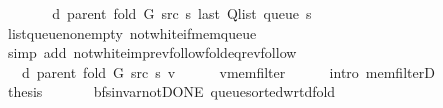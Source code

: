 \begin{isabellebody}
\ \ \isamarkupfalse%
\ \isamarkupfalse%
\ {\isachardoublequoteopen}{\isachardot}{\kern0pt}{\isachardot}{\kern0pt}{\isachardot}{\kern0pt}\ {\isacharequal}{\kern0pt}\ d\ {\isacharparenleft}{\kern0pt}parent\ {\isacharparenleft}{\kern0pt}fold\ G\ src\ s{\isacharparenright}{\kern0pt}{\isacharparenright}{\kern0pt}\ {\isacharparenleft}{\kern0pt}last\ {\isacharparenleft}{\kern0pt}Q{\isacharunderscore}{\kern0pt}list\ {\isacharparenleft}{\kern0pt}queue\ s{\isacharparenright}{\kern0pt}{\isacharparenright}{\kern0pt}{\isacharparenright}{\kern0pt}{\isachardoublequoteclose}\isanewline
\ \ \ \ \isamarkupfalse%
\ list{\isacharunderscore}{\kern0pt}queue{\isacharunderscore}{\kern0pt}non{\isacharunderscore}{\kern0pt}empty\ not{\isacharunderscore}{\kern0pt}white{\isacharunderscore}{\kern0pt}if{\isacharunderscore}{\kern0pt}mem{\isacharunderscore}{\kern0pt}queue\isanewline
\ \ \ \ \isamarkupfalse%
\ {\isacharparenleft}{\kern0pt}simp\ add{\isacharcolon}{\kern0pt}\ not{\isacharunderscore}{\kern0pt}white{\isacharunderscore}{\kern0pt}imp{\isacharunderscore}{\kern0pt}rev{\isacharunderscore}{\kern0pt}follow{\isacharunderscore}{\kern0pt}fold{\isacharunderscore}{\kern0pt}eq{\isacharunderscore}{\kern0pt}rev{\isacharunderscore}{\kern0pt}follow{\isacharparenright}{\kern0pt}\isanewline
\ \ \isamarkupfalse%
\ \isamarkupfalse%
\ {\isachardoublequoteopen}{\isachardot}{\kern0pt}{\isachardot}{\kern0pt}{\isachardot}{\kern0pt}\ {\isasymle}\ d\ {\isacharparenleft}{\kern0pt}parent\ {\isacharparenleft}{\kern0pt}fold\ G\ src\ s{\isacharparenright}{\kern0pt}{\isacharparenright}{\kern0pt}\ v{\isachardoublequoteclose}\isanewline
\ \ \ \ \isamarkupfalse%
\ v{\isacharunderscore}{\kern0pt}mem{\isacharunderscore}{\kern0pt}filter\isanewline
\ \ \ \ \isamarkupfalse%
\ {\isacharparenleft}{\kern0pt}intro\ mem{\isacharunderscore}{\kern0pt}filterD{\isacharparenleft}{\kern0pt}{}{\isacharparenright}{\kern0pt}{\isacharparenright}{\kern0pt}\isanewline
\ \ \isamarkupfalse%
\ \isamarkupfalse%
\ {\isacharquery}{\kern0pt}thesis\isanewline
\ \ \ \ \isacommand{{\isachardot}{\kern0pt}}\isamarkupfalse%
\isanewline
{}\isamarkupfalse%
%
\endisatagproof
{\isafoldproof}%
%
\isadelimproof
\isanewline
%
\endisadelimproof
\isanewline
{}\isamarkupfalse%
\ {\isacharparenleft}{\kern0pt}\ bfs{\isacharunderscore}{\kern0pt}invar{\isacharunderscore}{\kern0pt}not{\isacharunderscore}{\kern0pt}DONE{\isacharparenright}{\kern0pt}\ queue{\isacharunderscore}{\kern0pt}sorted{\isacharunderscore}{\kern0pt}wrt{\isacharunderscore}{\kern0pt}d{\isacharunderscore}{\kern0pt}fold{\isacharcolon}{\kern0pt}\isanewline

\end{isabellebody}
